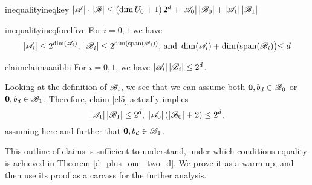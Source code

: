 \begin{restatable}{inequality}{ineqkey}\label{in1}
    $\left|{\mathscr{A}}\right| \cdot\left|{\mathscr{B}}\right| \leq \left(\operatorname{dim} U_0+1\right) 2^d+\left|{\mathscr{A}}_0\right|\left|{\mathscr{B}}_0\right|+\left|{\mathscr{A}}_1\right|\left|{\mathscr{B}}_1\right|$
\end{restatable}

\begin{restatable}{inequality}{ineqforclfive}\label{ineqForCl5}
    For $i = 0,1$ we have 
    \[
        |{\mathscr{A}}_i| \leq 2^{\operatorname{dim}({\mathscr{A}}_i)},\;|{\mathscr{B}}_i| \leq 2^{\operatorname{dim}(\operatorname{span}({\mathscr{B}}_i))} \text{, and } \operatorname{dim}({\mathscr{A}}_i) + \operatorname{dim}\bigl(\operatorname{span}({\mathscr{B}}_i)\bigl) \leq d
    \]
\end{restatable}

\begin{restatable}{claim}{claimaaaibbi}\label{cl5}
    For $i=0, 1$, we have $\left|{\mathscr{A}}_i\right|\left|{\mathscr{B}}_i\right| \leq 2^d$.
\end{restatable}

\noindent Looking at the definition of ${\mathscr{B}}_i$, we see that we can assume both  $\mathbf{0}, b_d \in {\mathscr{B}}_0$ or $\mathbf{0}, b_d \in {\mathscr{B}}_1$. Therefore, claim \ref{cl5} actually implies
\begin{equation}\label{stronger5}
    \left|{\mathscr{A}}_1\right|\left|{\mathscr{B}}_1\right| \leq 2^d,\; \left|{\mathscr{A}}_0\right|\left(\left|{\mathscr{B}}_0\right|+2\right)\leq 2^d,
\end{equation}
assuming here and further that $\mathbf{0}, b_d \in {\mathscr{B}}_1$.

\noindent This outline of claims is sufficient to  understand, under which conditions equality is achieved in Theorem \ref{d_plus_one_two_d}. We prove it as a warm-up, and then use its proof as a carcass for the further analysis.


